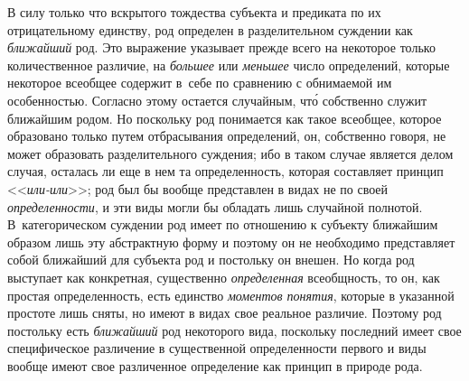 В силу только что вскрытого тождества субъекта и предиката по
их отрицательному единству, род определен в разделительном суждении как
{\em ближайший} род. Это
выражение указывает прежде всего на некоторое только количественное
различие, на {\em большее} или {\em меньшее}
число определений, которые некоторое всеобщее содержит в~себе
по сравнению с обнимаемой им особенностью. Согласно этому остается
случайным, чт\'{о} собственно служит ближайшим родом. Но поскольку род
понимается как такое всеобщее, которое образовано только путем отбрасывания
определений, он, собственно говоря, не может образовать разделительного
суждения; ибо в таком случае является делом случая, осталась ли еще в нем
та определенность, которая составляет принцип <<{\em или-или}>>; род был
бы вообще представлен в видах не по своей {\em определенности}, и
эти виды могли бы обладать лишь случайной полнотой. В~категорическом
суждении род имеет по отношению к субъекту ближайшим образом лишь эту
абстрактную форму и поэтому он не необходимо представляет собой ближайший
для субъекта род и постольку он внешен. Но когда род выступает как
конкретная, существенно {\em определенная}
всеобщность, то он, как простая определенность, есть единство
{\em моментов понятия},
которые в указанной простоте лишь сняты, но
имеют в видах свое реальное различие. Поэтому род постольку есть
{\em ближайший} род
некоторого вида, поскольку последний имеет свое специфическое различение в
существенной определенности первого и виды вообще имеют свое различенное
определение как принцип в природе рода.

